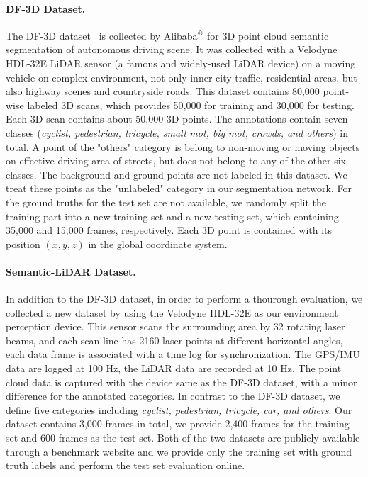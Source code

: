 \documentclass{sip}%
\begin{document}
\paragraph{DF-3D Dataset.}
The DF-3D dataset~\cite{timmurphy.org} is collected by Alibaba$\textsuperscript{\textregistered}$ for 3D point cloud semantic segmentation of autonomous driving scene.
It was collected with a Velodyne HDL-32E LiDAR sensor (a famous and widely-used LiDAR device) on a moving vehicle on complex environment, not only inner city traffic, residential areas, but also highway scenes and countryside
roads.
%
This dataset contains 80,000 point-wise labeled 3D scans, which provides 50,000 for training and 30,000 for testing.
Each 3D scan contains about 50,000 3D points.
The annotations contain seven classes (\emph{cyclist, pedestrian, tricycle, small mot, big mot, crowds, and others}) in total.
A point of the "others" category is belong to non-moving or moving objects on effective driving area of streets, but does not belong to any of the other six classes.
The background and ground points are not labeled in this dataset. 
We treat these points as the "unlabeled" category in our segmentation network.
For the ground truths for the test set are not available, we randomly split the training part into a new training set and a new testing set, which containing 35,000 and 15,000 frames, respectively.
Each 3D point is contained with its position $({x, y, z})$ in the global coordinate system.




\paragraph{Semantic-LiDAR Dataset.}
In addition to the DF-3D dataset, in order to perform a thourough evaluation, we collected a new dataset by using the Velodyne HDL-32E as our environment perception device. 
This sensor scans the surrounding area by 32 rotating laser beams, and each scan line has 2160 laser points at different horizontal angles, each data frame is associated with a time log for synchronization. 
The GPS/IMU data are logged at 100 Hz, the LiDAR data are recorded at 10 Hz.
The point cloud data is captured with the device same as the DF-3D dataset, with a minor difference for the annotated categories.
In contrast to the DF-3D dataset, we define five categories including \emph{cyclist, pedestrian, tricycle, car, and others}.
Our dataset contains 3,000 frames in total, we provide 2,400 frames for the training set and 600 frames as the test set.
Both of the two datasets are publicly available through a benchmark website and we provide only the training set with ground
truth labels and perform the test set evaluation online.
\end{document}
